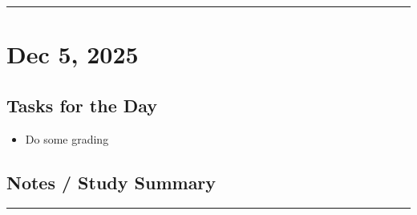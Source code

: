 \documentclass[12pt]{article}
\begin{document}
\vspace{1em}
\hrule
\vspace{1em}

\section*{Dec 5, 2025}

\subsection*{Tasks for the Day}
\begin{itemize}
    \item Do some grading
\end{itemize}
\subsection*{Notes / Study Summary}


\vspace{1em}
\hrule
\vspace{1em}
\end{document}
